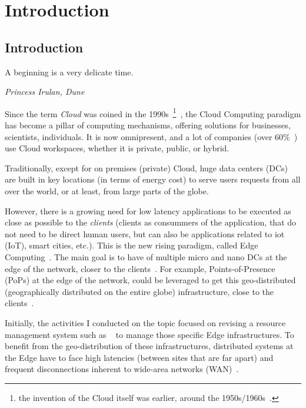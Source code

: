 

\part*{Introduction}



\chapter*{Introduction}
%
\epigraph{A beginning is a very delicate time.}{\emph{Princess Irulan, Dune}}

%
Since the term \emph{Cloud} was coined in the 1990s~\footnote{the
  invention of the Cloud itself was earlier, around the
  1950s/1960s~\cite{history}.}~\cite{what-is-the-cloud,history-cloud},
the Cloud Computing paradigm has become a pillar of computing
mechanisms, offering solutions for businesses, scientists,
individuals.
%
%
It is now omnipresent, and a lot of companies (over 60\%~\cite{stats})
use Cloud workspaces, whether it is private, public, or hybrid.


Traditionally, except for on premises (private) Cloud, huge data
centers (\acrshort{DC}s) are built in key locations (\eg in terms of
energy cost) to serve users requests from all over the world, or at
least, from large parts of the globe.


However, there is a growing need for low latency applications to be
executed as close as possible to the \emph{clients} (clients as
consummers of the application, that do not need to be direct human
users, but can also be applications related to \gls{iot}
(\acrshort{IoT}), smart cities, etc.).
%
This is the new rising paradigm, called Edge Computing~\cite{Sat17}.
%
The main goal is to have of multiple micro and nano DCs at the edge of
the network, closer to the clients~\cite{SCZ+16}.
%
For example, Points-of-Presence (\acrshort{PoP}s) at the edge of the
network, could be leveraged to get this geo-distributed
(geographically distributed on the entire globe) infrastructure, close
to the clients~\cite{ELNC20}.



Initially, the activities I conducted on the topic focused on revising
a resource management system such as \os~\cite{os} to manage those
specific Edge infrastructures.
%
To benefit from the geo-distribution of these infrastructures,
distributed systems at the Edge have to face high latencies (between
sites that are far apart) and frequent disconnections inherent to
wide-area networks (WAN)~\cite{Sat17, MISC+08}.

